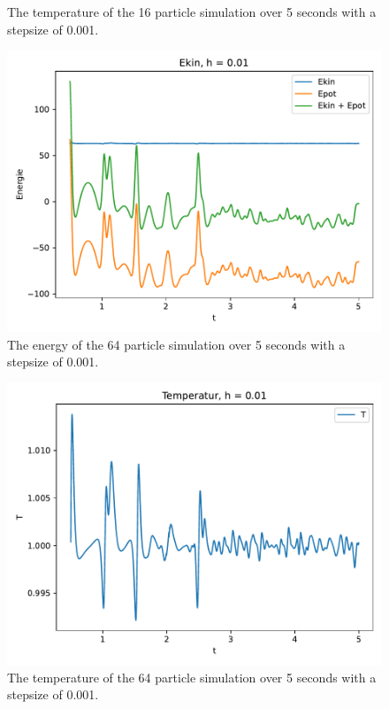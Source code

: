 \begin{itemize}
\begin{figure}
            \caption{The temperature of the 16 particle simulation over 5 seconds with a stepsize of 0.001.}
        \end{figure}        \begin{figure}
            \includegraphics[width=\textwidth]{images/plot_E_64.pdf}
            \caption{The energy of the 64 particle simulation over 5 seconds with a stepsize of 0.001.}
        \end{figure}        \begin{figure}
            \includegraphics[width=\textwidth]{images/plot_T_64.pdf}
            \caption{The temperature of the 64 particle simulation over 5 seconds with a stepsize of 0.001.}
        \end{figure}        \begin{figure}

\end{figure}
\end{itemize}
